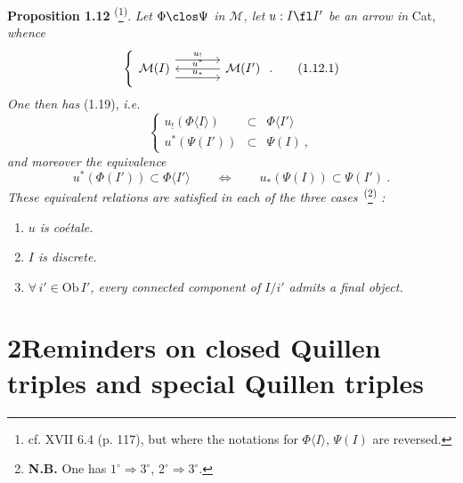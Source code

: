 \textbf{Proposition 1.12} \textsuperscript{(}\footnote[5]{cf. XVII 6.4 (p. 117), but where the notations for $\Phi\langle I\rangle$, $\Psi(I)$ are reversed.}\textsuperscript{)}. \textit{Let $\Phi \clos \Psi$ in $\mathcal{M}$, let $u : I \fl I'$ be an arrow in} Cat, \textit{whence}
\[
\left\{
\begin{tikzcd}[column sep=large]
\mathcal{M}(I) \arrow[r, shift left=3, "u_{!}"] \arrow[r, shift right=3, "u_{*}"] & \mathcal{M}(I') \arrow[l, "u^{*}"']
\end{tikzcd}
\right.
.
\tag*{(1.12.1)}
\]
\textit{One then has} (1.19), \textit{i.e.}
\[
\left\{
\begin{array}{rcl}
u_{!}(\Phi\langle I\rangle) & \subset & \Phi\langle I'\rangle \\
u^{*}(\Psi(I')) & \subset & \Psi(I)\ ,
\end{array}
\right.
\tag*{(1.13.1)}
\]
\textit{and moreover the equivalence}
\[
u^{*}(\Phi(I')) \subset \Phi\langle I'\rangle \qquad \Longleftrightarrow \qquad u_{*}(\Psi(I)) \subset \Psi(I')\ . \tag*{(1.13.2)}
\]
\textit{These equivalent relations are satisfied in each of the three cases}~\textsuperscript{(}\footnote[6]{\textbf{N.B.} One has $1^{\circ} \Longrightarrow 3^{\circ}$, $2^{\circ} \Longrightarrow 3^{\circ}$.}\textsuperscript{)} \textit{:}
\begin{enumerate}[label={}]
\item[1°)] \textit{$u$ is coétale.}
\item[2°)] \textit{$I$ is discrete.}
\item[3°)] $\forall\, i' \in \mathrm{Ob}\, I'$\textit{, every connected component of $I/i'$ admits a final object.}
\end{enumerate}

\section*{2\quad Reminders on closed Quillen triples and special Quillen triples}


